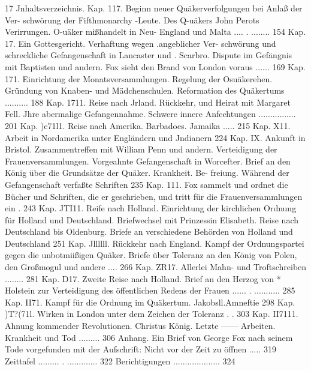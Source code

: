 
17 Jnhaltsverzeichnis.
Kap. 117. Beginn neuer Quäkerverfolgungen bei Anlaß der Ver-
schwörung der Fifthmonarchy -Leute. Des Q-uäkers
John Perots Verirrungen. O-uäker mißhandelt in Neu-
England und Malta .... . ........ 154
Kap. 17. Ein Gottesgericht. Verhaftung wegen .angeblicher Ver-
schwörung und schreckliche Gefangenschaft in Lancaster und .
Scarbro. Dispute im Gefängnis mit Baptisten und andern.
Fox sieht den Brand von London voraus ...... 169
Kap. 171. Einrichtung der Monatsversammlungen. Regelung der
Osuäkerehen. Gründung von Knaben- und Mädchenschulen.
Reformation des Quäkertums .......... 188
Kap. 1711. Reise nach Jrland. Rückkehr, und Heirat mit Margaret
Fell. Jhre abermalige Gefangennahme. Schwere innere
Anfechtungen ................ 201
Kap. )c71l1. Reise nach Amerika. Barbadoes. Jamaika ..... 215
Kap. X11. Arbeit in Nordamerika unter Engländern und Jndianern 224
Kap. IX. Ankunft in Bristol. Zusammentreffen mit William Penn
und andern. Verteidigung der Frauenversammlungen.
Vorgeahnte Gefangenschaft in Worcefter. Brief an den
König über die Grundsätze der Quäker. Krankheit. Be-
freiung. Während der Gefangenschaft verfaßte Schriften 235
Kap. 111. Fox sammelt und ordnet die Bücher und Schriften, die er
geschrieben, und tritt für die Frauenversammlungen ein . 243
Kap. JTI11. Reife nach Holland. Einrichtung der kirchlichen Ordnung
für Holland und Deutschland. Briefwechsel mit Prinzessin
Elisabeth. Reise nach Deutschland bis Oldenburg. Briefe
an verschiedene Behörden von Holland und Deutschland 251
Kap. Jllllll. Rückkehr nach England. Kampf der Ordnungspartei gegen
die unbotmiißigen Quäker. Briefe über Toleranz an den
König von Polen, den Großmogul und andere .... 266
Kap. ZR17. Allerlei Mahn- und Troftschreiben ........ 281
Kap. D17. Zweite Reise nach Holland. Brief an den Herzog von *
Holstein zur Verteidigung des öffentlichen Redens der
Frauen ...... . ........... 285
Kap. II71. Kampf für die Ordnung im Quäkertum. Jakobsll.Amneftie 298
Kap. )T?(71l. Wirken in London unter dem Zeichen der Toleranz . . 303
Kap. II7111. Ahnung kommender Revolutionen. Christus König. Letzte
—— Arbeiten. Krankheit und Tod ......... 306
Anhang. Ein Brief von George Fox nach seinem Tode vorgefunden mit
der Aufschrift: Nicht vor der Zeit zu öffnen ..... 319
Zeittafel ......... . ............. 322
Berichtigungen .................... 324




